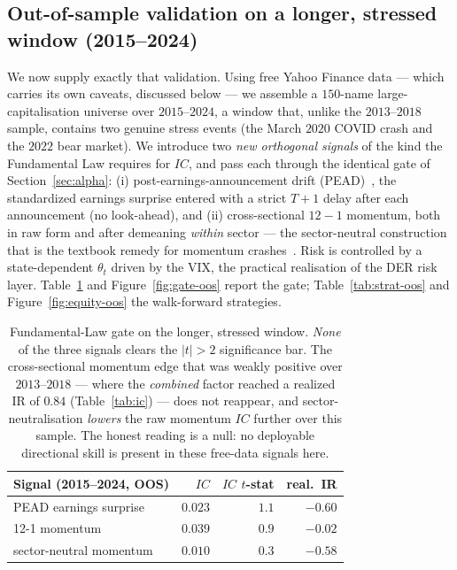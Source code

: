 \documentclass[11pt]{article}
\theoremstyle{definition}
\begin{document}
\subsection{Out-of-sample validation on a longer, stressed window
(2015--2024)}\label{sec:alpha-oos}

We now supply exactly that validation. Using free Yahoo Finance data --- which carries
its own caveats, discussed below --- we assemble a $150$-name large-capitalisation
universe over $2015$--$2024$, a window that, unlike the $2013$--$2018$ sample, contains
two genuine stress events (the March $2020$ COVID crash and the $2022$ bear market). We
introduce two \emph{new orthogonal signals} of the kind the Fundamental Law requires for
$IC$, and pass each through the identical gate of Section~\ref{sec:alpha}: (i)
post-earnings-announcement drift (PEAD)~\cite{bernard1989}, the standardized earnings
surprise entered with a strict $T{+}1$ delay after each announcement (no look-ahead),
and (ii) cross-sectional $12{-}1$ momentum, both in raw form and after demeaning
\emph{within} sector --- the sector-neutral construction that is the textbook remedy
for momentum crashes~\cite{daniel2016}. Risk is controlled by a state-dependent
$\theta_t$ driven by the VIX, the practical realisation of the DER risk layer.
Table~\ref{tab:ic-oos} and Figure~\ref{fig:gate-oos} report the gate;
Table~\ref{tab:strat-oos} and Figure~\ref{fig:equity-oos} the walk-forward strategies.

\begin{table}[h]
\centering
\begin{tabular}{lrrr}
\toprule
Signal (2015--2024, OOS) & $IC$ & $IC$ $t$-stat & real.\ IR \\
\midrule
PEAD earnings surprise   & $0.023$ & $1.1$ & $-0.60$ \\
12-1 momentum            & $0.039$ & $0.9$ & $-0.02$ \\
sector-neutral momentum  & $0.010$ & $0.3$ & $-0.58$ \\
\bottomrule
\end{tabular}
\caption{Fundamental-Law gate on the longer, stressed window. \emph{None} of the three
signals clears the $|t|>2$ significance bar. The cross-sectional momentum edge that was
weakly positive over $2013$--$2018$ --- where the \emph{combined} factor reached a
realized IR of $0.84$ (Table~\ref{tab:ic}) --- does not reappear, and
sector-neutralisation \emph{lowers} the raw momentum $IC$ further over this sample. The
honest reading is a null: no deployable directional skill is present in these free-data
signals here.}
\label{tab:ic-oos}
\end{table}
\end{document}
